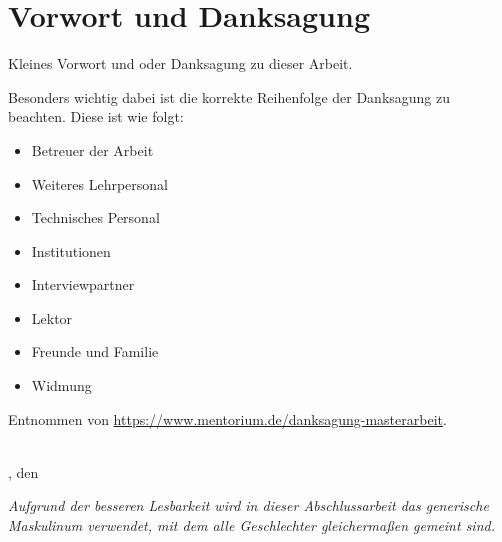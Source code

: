 
\cleardoublepage
{} %
\chapter*{Vorwort und Danksagung}
Kleines Vorwort und oder Danksagung zu dieser Arbeit.

Besonders wichtig dabei ist die korrekte Reihenfolge der Danksagung zu beachten.
Diese ist wie folgt:
\begin{itemize}
    \item Betreuer der Arbeit
    \item Weiteres Lehrpersonal
    \item Technisches Personal
    \item Institutionen
    \item Interviewpartner
    \item Lektor
    \item Freunde und Familie
    \item Widmung
\end{itemize}

Entnommen von \url{https://www.mentorium.de/danksagung-masterarbeit}.


\begin{flushright}
    \Autor \\
    \footnotesize{\AutorOrt, den \VorgelegtAm}
\end{flushright}

\textit{Aufgrund der besseren Lesbarkeit wird in dieser Abschlussarbeit das generische Maskulinum verwendet, mit dem alle Geschlechter gleichermaßen gemeint sind.}

